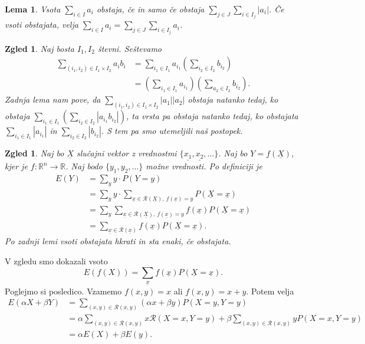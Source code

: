 \documentclass[10pt, a4paper]{article}
\newtheorem{zgled}[izr]{Zgled}
\newtheorem{lema}[izr]{Lema}
\newcommand{\R}{\mathbb {R}}
\begin{document}
\begin{lema}
  Vsota $\sum_{i \in I} a_i$ obstaja, če in samo če obstaja $\sum_{j \in J} \sum_{i \in I_j} |a_i|$.
  Če vsoti obstajata, velja $\sum_{i \in I} a_i = \sum_{j \in J} \sum_{i \in I_j} a_i$.
\end{lema}

\begin{zgled}
  Naj bosta $I_1, I_2$ števni. Seštevamo 
  \begin{align*}
    \sum_{(i_1, i_2) \in I_1 \times I_2} a_i b_i &= \sum_{i_1 \in I_1} a_{i_1} \left(\sum_{i_2 \in I_2} b_{i_2}\right)\\
    &= \left(\sum_{i_1 \in I_1} a_{i_1}\right) \left(\sum_{a_2 \in I_2} b_{i_2}\right).
  \end{align*}
  Zadnja lema nam pove, da $\sum_{(i_1, i_2) \in I_1 \times I_2} |a_1| |a_2|$
  obstaja natanko tedaj, ko obstaja 
  $\sum_{i_1 \in I_1} \left(\sum_{i_2 \in I_2} |a_{i_1} b_{i_2}|\right)$,
  ta vrsta pa obstaja natanko tedaj, ko obstajata 
  $\sum_{i_1 \in I_1} |a_{i_1}|$ in $\sum_{i_2 \in I_2} |b_{i_2}|$.
  S tem pa smo utemeljili naš postopek.
\end{zgled}

\begin{zgled}
  Naj bo $\underline{X}$ slučajni vektor z vrednostmi $\{\underline{x_1} , \underline{x_2}, \dots\}$.
  Naj bo $Y = f(\underline{X})$, kjer je $f: \R^n \to \R$. Naj bodo $\{y_1, y_2, \dots\}$ možne vrednosti.
  Po definiciji je 
  \begin{align*}
    E(Y) &= \sum_y y \cdot P(Y = y)\\
    &= \sum_y y \cdot \sum_{\underline{x} \in \mathcal{R} (\underline{X}),\ f(\underline{x}) = y} P(\underline{X} = \underline{x})\\
    &= \sum_y \sum_{\underline{x} \in \mathcal{R} (\underline{X}),\ f(\underline{x}) = y} f(\underline{x}) P(\underline{X} = \underline{x})\\
    &= \sum_{\underline{x} \in \mathcal{R}(\underline{x})} f(\underline{x}) P(\underline{X} = \underline{x}).
  \end{align*}
  Po zadnji lemi vsoti obstajata hkrati in sta enaki, če obstajata.
\end{zgled}

V zgledu smo dokazali vsoto 
$$E(f(X)) = \sum_{\underline{x}} f(\underline{x}) P(\underline{X} = \underline{x}).$$
Poglejmo si posledico. Vzamemo $f(x, y) = x$ ali $f(x, y) = x + y$.
Potem velja 
\begin{align*}
  E(\alpha X + \beta Y) &= \sum_{(x, y) \in \mathcal{R} (x, y)} (\alpha x + \beta y) P(X = y, Y = y)\\
  &= \alpha \sum_{(x, y) \in \mathcal{R} (x, y)} x \mathcal{R} (X = x, Y = y) + \beta \sum_{(x, y) \in \mathcal{R} (x, y)} y P(X = x, Y = y)\\
  &= \alpha E(X) + \beta E(y).
\end{align*}
\end{document}
